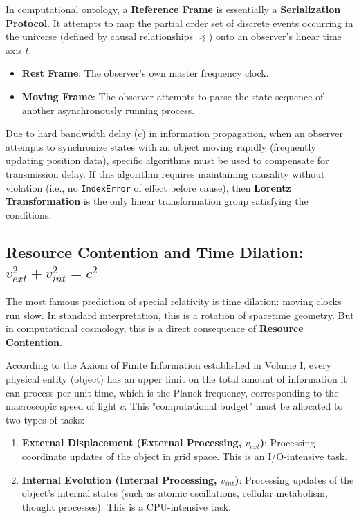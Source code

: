 \begin{definition}
In computational ontology, a \textbf{Reference Frame} is essentially a \textbf{Serialization Protocol}. It attempts to map the partial order set of discrete events occurring in the universe (defined by causal relationships $\preceq$) onto an observer's linear time axis $t$.

\begin{itemize}
\item \textbf{Rest Frame}: The observer's own master frequency clock.

\item \textbf{Moving Frame}: The observer attempts to parse the state sequence of another asynchronously running process.
\end{itemize}
\end{definition}

Due to hard bandwidth delay ($c$) in information propagation, when an observer attempts to synchronize states with an object moving rapidly (frequently updating position data), specific algorithms must be used to compensate for transmission delay. If this algorithm requires maintaining causality without violation (i.e., no \texttt{IndexError} of effect before cause), then \textbf{Lorentz Transformation} is the only linear transformation group satisfying the conditions.

\subsection{Resource Contention and Time Dilation: $v_{ext}^2 + v_{int}^2 = c^2$}

The most famous prediction of special relativity is time dilation: moving clocks run slow. In standard interpretation, this is a rotation of spacetime geometry. But in computational cosmology, this is a direct consequence of \textbf{Resource Contention}.

According to the Axiom of Finite Information established in Volume I, every physical entity (object) has an upper limit on the total amount of information it can process per unit time, which is the Planck frequency, corresponding to the macroscopic speed of light $c$. This "computational budget" must be allocated to two types of tasks:

\begin{enumerate}
\item \textbf{External Displacement (External Processing, $v_{ext}$)}: Processing coordinate updates of the object in grid space. This is an I/O-intensive task.

\item \textbf{Internal Evolution (Internal Processing, $v_{int}$)}: Processing updates of the object's internal states (such as atomic oscillations, cellular metabolism, thought processes). This is a CPU-intensive task.
\end{enumerate}

